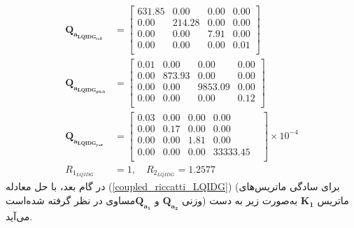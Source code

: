 \documentclass{CCI2020}
\begin{document}
		\begin{equation}
			\begin{split}
				\boldsymbol{Q_{a_{LQIDG_{roll}}}} &= \begin{bmatrix}
					631.85 & 0.00 & 0.00 & 0.00  \\ 
					0.00 & 214.28 & 0.00 & 0.00  \\ 
					0.00 & 0.00 & 7.91 & 0.00  \\ 
					0.00 & 0.00 & 0.00 & 0.01  \\ 
				\end{bmatrix} \\
				\boldsymbol{Q_{a_{LQIDG_{pitch}}}} &= \begin{bmatrix}
					0.01 & 0.00 & 0.00 & 0.00  \\
					0.00 & 873.93 & 0.00 & 0.00  \\ 
					0.00 & 0.00 & 9853.09 & 0.00 \\ 
					0.00 & 0.00 & 0.00 & 0.12  \\ 
				\end{bmatrix}\\
				\boldsymbol{Q_{a_{LQIDG_{yaw}}}}  &= \begin{bmatrix}
					0.03 & 0.00 & 0.00 & 0.00 & \\ 
					0.00 & 0.17 & 0.00 & 0.00 & \\ 
					0.00 & 0.00 & 1.81 & 0.00 & \\ 
					0.00 & 0.00 & 0.00 & 33333.45 & \\
				\end{bmatrix}\times 10^{-4}\\  R_{1_{LQIDG}} &= 1, \quad  R_{2_{LQIDG}} = 1.2577
			\end{split}
		\end{equation}
		در گام بعد، با حل معادله
		(\ref{coupled_riccatti_LQIDG})
		(برای سادگی ماتریس‌های وزنی $\boldsymbol{{Q}_{a_2}}$ و $\boldsymbol{{Q}_{a_1}}$مساوی در نظر گرفته شده‌است)
		ماتریس
		$\boldsymbol{{K}_1}$
		به‌صورت زیر به دست می‌آید.
\end{document}
